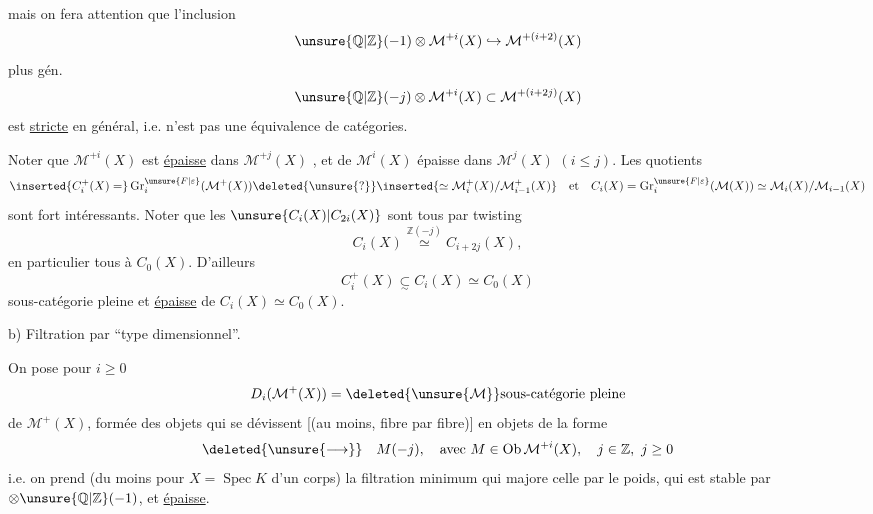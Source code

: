 mais on fera attention que l'inclusion
\[
\unsure{\mathbb{Q}|\mathbb{Z}}(-1)\otimes \mathcal{M}^{+i}(X)
\hookrightarrow \mathcal{M}^{+(i+2)}(X)
\]
plus gén.
\[
\unsure{\mathbb{Q}|\mathbb{Z}}(-j)\otimes \mathcal{M}^{+i}(X)
\subset \mathcal{M}^{+(i+2j)}(X)
\]
est \uline{stricte} en général, i.e. n'est pas
une équivalence de catégories.

Noter que $\mathcal{M}^{+i}(X)$ est \uline{épaisse} dans $\mathcal{M}^{+j}(X)$
\deleted{[elle est définie dans la catégorie}, et de
 $\mathcal{M}^i(X)$ épaisse dans $\mathcal{M}^j(X)$ $(i\leq j)$.
Les quotients
\[
\inserted{C_i^+(X)=}
\operatorname{Gr}_i^{\unsure{F|\varepsilon}}(\mathcal{M}^+(X))
\deleted{\unsure{\mathord{?}}}
\inserted{\simeq \mathcal{M}_i^+(X)/\mathcal{M}_{i-1}^+(X)}
\quad\text{et}\quad
C_i(X)=\operatorname{Gr}_i^{\unsure{F|\varepsilon}}(\mathcal{M}(X))
\simeq \mathcal{M}_i(X)/\mathcal{M}_{i-1}(X)
\]
sont fort intéressants.
Noter que les $\unsure{C_i(X)|C_{2i}(X)}$ sont tous
par twisting
\[
C_i(X)\overset{\mathbb{Z}(-j)}{\simeq}C_{i+2j}(X),
\]
en particulier tous  à $C_0(X)$.
D'ailleurs
\[
C_i^+(X)\underset{\sim}{\subset}C_i(X)\simeq C_0(X)
\]
 sous-catégorie pleine et \uline{épaisse} de
$C_i(X)\simeq C_0(X)$.

b) Filtration par  ``type dimensionnel''.

On pose pour $i\geq0$
\[
D_i(\mathcal{M}^+(X))=
\deleted{\unsure{\mathcal{M}}}\text{sous-catégorie pleine}
\]
de $\mathcal{M}^+(X)$, formée des objets
qui se  dévissent [(au moins,
fibre par fibre)] en objets
de la forme
\[
\deleted{\unsure{\longrightarrow}}\quad
M(-j),\quad\text{avec }M\in\operatorname{Ob}\mathcal{M}^{+i}(X),\quad
j\in\mathbb{Z},\ j\geq0
\]
i.e. on prend (du moins pour $X=\operatorname{Spec}K$ d'un
corps) la filtration minimum qui
majore celle par le poids,  qui est
stable par $\otimes\unsure{\mathbb{Q}|\mathbb{Z}}(-1)$, et \uline{épaisse}.

